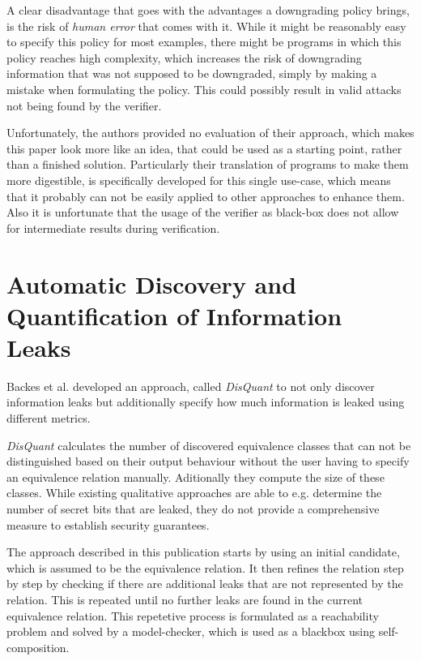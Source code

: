 \documentclass[a4paper,UKenglish]{lipics-v2018}
\begin{document}
A clear disadvantage that goes with the advantages a downgrading policy brings, is the risk of \textit{human error} that comes with it. While it might be reasonably easy to specify this policy for most examples, there might be programs in which this policy reaches high complexity, which increases the risk of downgrading information that was not supposed to be downgraded, simply by making a mistake when formulating the policy. This could possibly result in valid attacks not being found by the verifier.

Unfortunately, the authors provided no evaluation of their approach, which makes this paper look more like an idea, that could be used as a starting point, rather than a finished solution. Particularly their translation of programs to make them more digestible, is specifically developed for this single use-case, which means that it probably can not be easily applied to other approaches to enhance them. Also it is unfortunate that the usage of the verifier as black-box does not allow for intermediate results during verification.



\section{Automatic Discovery and Quantification of Information Leaks}

Backes et al. developed an approach, called \textit{DisQuant} to not only discover information leaks but additionally specify how much information is leaked using different metrics.\cite{automatic_discovery_and_quantification}

\textit{DisQuant} calculates the number of discovered equivalence classes that can not be distinguished based on their output behaviour without the user having to specify an equivalence relation manually. Aditionally they compute the size of these classes. While existing qualitative approaches are able to e.g. determine the number of secret bits that are leaked, they do not provide a comprehensive measure to establish security guarantees.\cite{automatic_discovery_and_quantification}

The approach described in this publication starts by using an initial candidate, which is assumed to be the equivalence relation. It then refines the relation step by step by checking if there are additional leaks that are not represented by the relation. This is repeated until no further leaks are found in the current equivalence relation. This repetetive process is formulated as a reachability problem and solved by a model-checker, which is used as a blackbox using self-composition.\cite{automatic_discovery_and_quantification}
\end{document}
